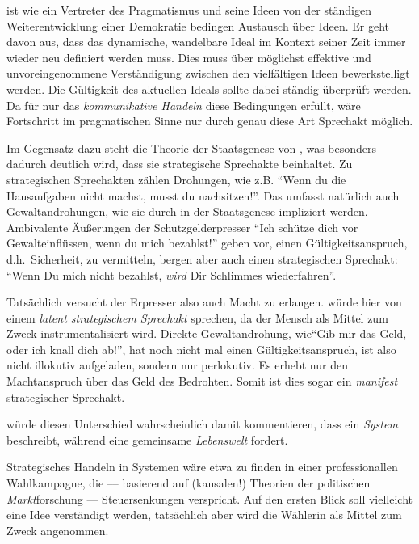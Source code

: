 \citeauthor{Dewey2010} ist wie \citeauthor{Habermas-1998-aa} ein Vertreter des Pragmatismus und seine Ideen von der ständigen Weiterentwicklung einer Demokratie bedingen Austausch über Ideen.
Er geht davon aus, dass das dynamische, wandelbare Ideal im Kontext seiner Zeit immer wieder neu definiert werden muss.
Dies muss über möglichst effektive und unvoreingenommene Verständigung zwischen den vielfältigen Ideen bewerkstelligt werden.
Die Gültigkeit des aktuellen Ideals sollte dabei ständig überprüft werden.
Da für \citeauthor{Habermas-1998-aa} nur das \emph{kommunikative Handeln} diese Bedingungen erfüllt, wäre Fortschritt im pragmatischen Sinne nur durch genau diese Art Sprechakt möglich.

Im Gegensatz dazu steht die Theorie der Staatsgenese von \citeauthor{Tilly-1985-aa}, was besonders dadurch deutlich wird, dass sie strategische Sprechakte beinhaltet.
Zu strategischen Sprechakten zählen Drohungen, wie z.B. ``Wenn du die Hausaufgaben nicht machst, musst du nachsitzen!''.
Das umfasst natürlich auch Gewaltandrohungen, wie sie durch \citeauthor{Tilly-1985-aa} in der Staatsgenese impliziert werden.
Ambivalente Äußerungen der Schutzgelderpresser ``Ich schütze dich vor Gewalteinflüssen, wenn du mich bezahlst!'' geben vor, einen Gültigkeitsanspruch, d.h.\ Sicherheit, zu vermitteln, bergen aber auch einen strategischen Sprechakt: ``Wenn Du mich nicht bezahlst, \emph{wird} Dir Schlimmes wiederfahren''.

Tatsächlich versucht der Erpresser also auch Macht zu erlangen.
\citeauthor{Habermas-1998-aa} würde hier von einem \emph{latent strategischem Sprechakt} sprechen, da der Mensch als Mittel zum Zweck instrumentalisiert wird.
Direkte Gewaltandrohung, wie``Gib mir das Geld, oder ich knall dich ab!'', hat noch nicht mal einen Gültigkeitsanspruch, ist also nicht illokutiv aufgeladen, sondern nur perlokutiv.
Es erhebt nur den Machtanspruch über das Geld des Bedrohten.
Somit ist dies sogar ein \emph{manifest} strategischer Sprechakt.

\citeauthor{Habermas-1998-aa} würde diesen Unterschied wahrscheinlich damit kommentieren, dass \citeauthor{Tilly-1985-aa} ein \emph{System} beschreibt, während \citeauthor{Dewey2010} eine gemeinsame \emph{Lebenswelt} fordert.

Strategisches Handeln in Systemen wäre etwa zu finden in einer professionallen Wahlkampagne, die –-- basierend auf (kausalen!) Theorien der politischen \emph{Markt}forschung --- Steuersenkungen verspricht.
Auf den ersten Blick soll vielleicht eine Idee verständigt werden, tatsächlich aber wird die Wählerin als Mittel zum Zweck angenommen.


